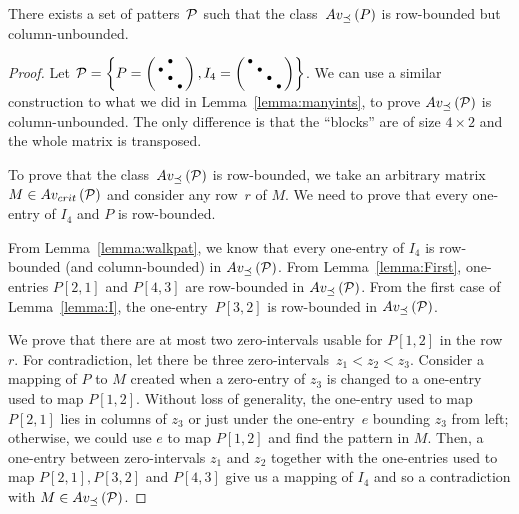 \begin{lemma}
There exists a set of patters~$\mathcal{P}$ such that the class~$Av_{\preceq}\left(P\right)$ is row-bounded but column-unbounded.
\end{lemma}
\begin{proof}
Let $\mathcal{P}=\left\lbrace P=\left(\begin{smallmatrix} &\bullet& \\\bullet& & \\ &\bullet& \\ & &\bullet\end{smallmatrix}\right),I_4=\left(\begin{smallmatrix}\bullet& & & \\ &\bullet& & \\ & &\bullet& \\ & & &\bullet\end{smallmatrix}\right)\right\rbrace$. We can use a similar construction to what we did in Lemma~\ref{lemma:manyints}, to prove $Av_{\preceq}\left(\mathcal{P}\right)$ is column-unbounded. The only difference is that the ``blocks'' are of size $4\times2$ and the whole matrix is transposed.

To prove that the class~$Av_{\preceq}\left(\mathcal{P}\right)$ is row-bounded, we take an arbitrary matrix~$M\in Av_{crit}\left(\mathcal{P}\right)$ and consider any row~$r$ of $M$. We need to prove that every one-entry of $I_4$ and $P$ is row-bounded.

From Lemma~\ref{lemma:walkpat}, we know that every one-entry of $I_4$ is row-bounded (and column-bounded) in $Av_{\preceq}\left(\mathcal{P}\right)$. From Lemma~\ref{lemma:First}, one-entries $P[2,1]$ and $P[4,3]$ are row-bounded in $Av_{\preceq}\left(\mathcal{P}\right)$. From the first case of Lemma~\ref{lemma:I}, the one-entry~$P[3,2]$ is row-bounded in $Av_{\preceq}\left(\mathcal{P}\right)$.

We prove that there are at most two zero-intervals usable for $P[1,2]$ in the row~$r$. For contradiction, let there be three zero-intervals~$z_1<z_2<z_3$. Consider a mapping of $P$ to $M$ created when a zero-entry of $z_3$ is changed to a one-entry used to map $P[1,2]$. Without loss of generality, the one-entry used to map $P[2,1]$ lies in columns of $z_3$ or just under the one-entry~$e$ bounding $z_3$ from left; otherwise, we could use $e$ to map $P[1,2]$ and find the pattern in $M$. Then, a one-entry between zero-intervals $z_1$ and $z_2$ together with the one-entries used to map $P[2,1],P[3,2]$ and $P[4,3]$ give us a mapping of $I_4$ and so a contradiction with $M\in Av_{\preceq}\left(\mathcal{P}\right)$.
\end{proof}

